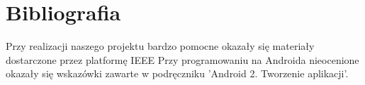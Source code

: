 \documentclass[11pt,a4paper]{article}
\begin{document}
\section{Bibliografia}
Przy realizacji naszego projektu bardzo pomocne okazały się materiały dostarczone przez platformę IEEE
\cite{2011IEEEIntGoldman}
\cite{2011IEEERadioMitchell}
\cite{2011DroidColunas}
Przy programowaniu na Androida nieocenione okazały się wskazówki zawarte w podręczniku 'Android 2. Tworzenie aplikacji'\cite{2010AndroidHashimi}.



\end{document}
